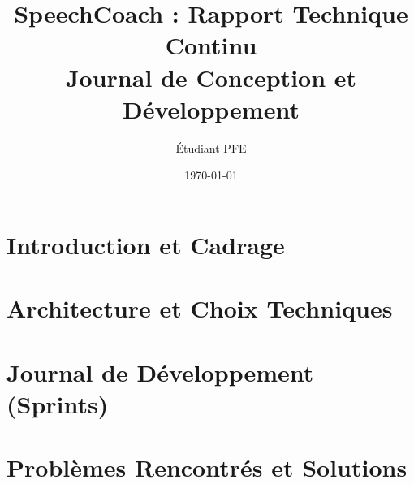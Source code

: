\documentclass[12pt, a4paper]{report}
\title{\textbf{SpeechCoach : Rapport Technique Continu} \\ \large Journal de Conception et Développement}
\author{Étudiant PFE}
\date{\today}
\begin{document}
\maketitle
\tableofcontents

\chapter{Introduction et Cadrage}


\chapter{Architecture et Choix Techniques}


\chapter{Journal de Développement (Sprints)}


\chapter{Problèmes Rencontrés et Solutions}

\end{document}
